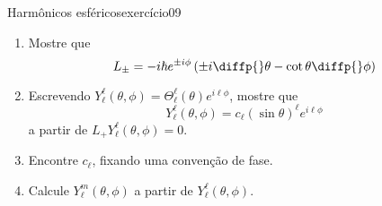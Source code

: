 \begin{exercício}{Harmônicos esféricos}{exercício09}
    \begin{enumerate}[label=(\alph*)]
        \item Mostre que
            \begin{equation*}
                L_{\pm} = -i\hbar e^{\pm i \phi} \left(\pm i\diffp{}\theta - \cot\theta \diffp{}\phi\right)
            \end{equation*}
        \item Escrevendo \(Y_\ell^\ell(\theta, \phi) = \Theta_\ell^\ell(\theta)e^{i\ell \phi}\), mostre que
            \begin{equation*}
                Y_\ell^\ell(\theta,\phi) = c_\ell (\sin \theta)^\ell e^{i\ell \phi}
            \end{equation*}
            a partir de \(L_+Y_\ell^\ell(\theta,\phi) = 0\).
        \item Encontre \(c_\ell\), fixando uma convenção de fase.
        \item Calcule \(Y_\ell^m(\theta,\phi)\) a partir de \(Y_\ell^\ell(\theta,\phi)\).
    \end{enumerate}
\end{exercício}
